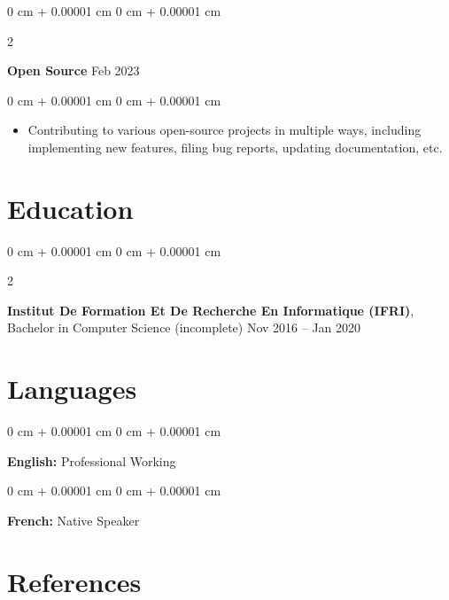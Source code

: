 \documentclass[10pt, letterpaper]{article}
\newenvironment{highlights}{
    \begin{itemize}[
        topsep=0.10 cm,
        parsep=0.10 cm,
        partopsep=0pt,
        itemsep=0pt,
        leftmargin=0 cm + 10pt
    ]
}{
    \end{itemize}
} %
\newenvironment{onecolentry}{
    \begin{adjustwidth}{
        0 cm + 0.00001 cm
    }{
        0 cm + 0.00001 cm
    }
}{
    \end{adjustwidth}
} %
\newenvironment{twocolentry}[2][]{
    \onecolentry
    \def\secondColumn{#2}
    \setcolumnwidth{\fill, 4.5 cm}
    \begin{paracol}{2}
}{
    \switchcolumn \raggedleft \secondColumn
    \end{paracol}
    \endonecolentry
} %
\begin{document}
        
        \begin{twocolentry}{
            Feb 2023
        }
            \textbf{Open Source}\end{twocolentry}

        \vspace{0.10 cm}
        \begin{onecolentry}
            \begin{highlights}
                \item Contributing to various open-source projects in multiple ways, including implementing new features, filing bug reports, updating documentation, etc.
            \end{highlights}
        \end{onecolentry}



    
    \section{Education}



        
        \begin{twocolentry}{
            Nov 2016 – Jan 2020
        }
            \textbf{Institut De Formation Et De Recherche En Informatique (IFRI)}, Bachelor in Computer Science (incomplete)\end{twocolentry}




    
    \section{Languages}



        
        \begin{onecolentry}
            \textbf{English:} Professional Working
        \end{onecolentry}

        \vspace{0.2 cm}

        \begin{onecolentry}
            \textbf{French:} Native Speaker
        \end{onecolentry}


    
    \section{References}
\end{document}
